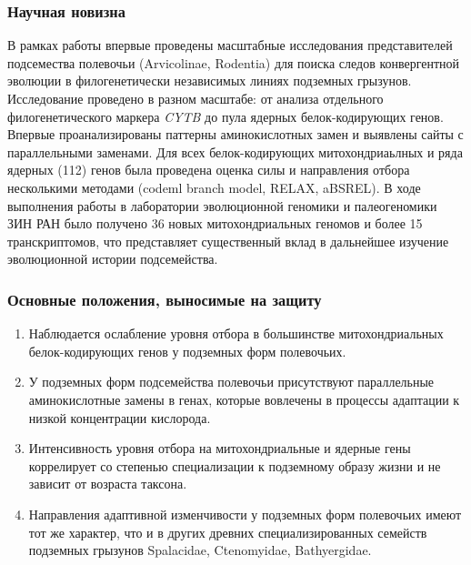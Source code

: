 \subsubsection*{Научная новизна}

В рамках работы впервые проведены масштабные исследования представителей подсемества полевочьи (Arvicolinae, Rodentia) для поиска следов конвергентной эволюции в филогенетически независимых линиях подземных грызунов. Исследование проведено в разном масштабе: от анализа отдельного филогенетического маркера \textit{CYTB} до пула ядерных белок-кодирующих генов. Впервые проанализированы паттерны аминокислотных замен и выявлены сайты с параллельными заменами. Для всех белок-кодирующих митохондриаьлных и ряда ядерных (112) генов была проведена оценка силы и направления отбора несколькими методами (codeml branch model, RELAX, aBSREL). В ходе выполнения работы в лаборатории эволюционной геномики и палеогеномики ЗИН РАН было получено 36 новых митохондриальных геномов и более 15 транскриптомов, что представляет существенный вклад в дальнейшее изучение эволюционной истории подсемейства. 
%

\subsubsection*{Основные положения, выносимые на защиту}

\begin{enumerate}
	\item Наблюдается ослабление уровня отбора в большинстве митохондриальных белок-кодирующих генов у подземных форм полевочьих. 
	\item У подземных форм подсемейства полевочьи присутствуют параллельные аминокислотные замены в генах, которые вовлечены в процессы адаптации к низкой концентрации кислорода.
	\item Интенсивность уровня отбора на митохондриальные и ядерные гены коррелирует со степенью специализации к подземному образу жизни и не зависит от возраста таксона.
	\item Направления адаптивной изменчивости у подземных форм полевочьих имеют тот же характер, что и в других древних специализированных семейств подземных грызунов Spalacidae, Ctenomyidae, Bathyergidae.
	 
\end{enumerate}
%

